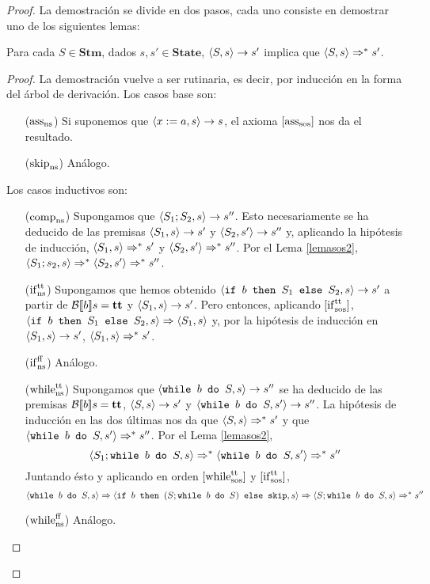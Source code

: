 \begin{proof}
La demostración se divide en dos pasos, cada uno consiste en demostrar uno de los siguientes lemas:
\begin{lema}
Para cada $S \in \mathbf{Stm}$, dados $s, s' \in \mathbf{State}$, $\langle S, s \rangle\rightarrow s'$ implica que $\langle S, s \rangle\Rightarrow^* s'$.
\end{lema}
\begin{proof}
La demostración vuelve a ser rutinaria, es decir, por inducción en la forma del árbol de derivación. Los casos base son:
\begin{itemize}
    \item[($\mathrm{ass}_{\mathrm{ns}}$)] Si suponemos que $\langle x:=a, s \rangle\to s$, el axioma $[\mathrm{ass}_{\mathrm{sos}}]$ nos da el resultado.
    \item[($\mathrm{skip}_{\mathrm{ns}}$)] Análogo.
\end{itemize}
Los casos inductivos son:
\begin{itemize}
    \item[($\mathrm{comp}_{\mathrm{ns}}$)]  Supongamos que $\langle S_1;S_2, s \rangle\to s''$. Esto necesariamente se ha deducido de las premisas $\langle S_1, s \rangle\to s'$ y $\langle S_2, s' \rangle\to s''$ y, aplicando la hipótesis de inducción, $\langle S_1, s \rangle\Rightarrow^*s'$ y $\langle S_2, s' \rangle\Rightarrow^* s''$. Por el Lema \ref{lemasos2}, $\langle S_1;s_2, s \rangle\Rightarrow^* \langle S_2, s' \rangle\Rightarrow^* s''$.
    \item[($\mathrm{if}_{\mathrm{ns}}^{\mathrm{tt}}$)] Supongamos que hemos obtenido $\langle \texttt{if }b \texttt{ then }S_1\texttt{ else }S_2, s \rangle\to s'$ a partir de $\mathcal{B}[\![b]\!]s = \mathbf{tt}$ y $\langle S_1, s \rangle\to s'$. Pero entonces, aplicando $[\mathrm{if}_{\mathrm{sos}}^{\mathrm{tt}}]$, $\langle \texttt{if }b \texttt{ then }S_1\texttt{ else }S_2, s \rangle\Rightarrow \langle S_1, s \rangle$ y, por la hipótesis de inducción en $\langle S_1, s \rangle\to s'$, $\langle S_1, s \rangle\Rightarrow^* s'$.
    \item[($\mathrm{if}_{\mathrm{ns}}^{\mathrm{ff}}$)] Análogo.
    \item[($\mathrm{while}_{\mathrm{ns}}^{\mathrm{tt}}$)] Supongamos que $\langle \texttt{while }b \texttt{ do }S, s \rangle\to s''$ se ha deducido de las premisas $\mathcal{B}[\![b]\!]s = \mathbf{tt}$, $\langle S, s \rangle\to s'$ y $\langle \texttt{while }b \texttt{ do }S, s' \rangle\to s''$. La hipótesis de inducción en las dos últimas nos da que $\langle S, s \rangle\Rightarrow^* s'$ y que $\langle \texttt{while }b \texttt{ do }S, s' \rangle\Rightarrow^* s''$. Por el Lema \ref{lemasos2}, 
    $$\langle S_1;\texttt{while }b \texttt{ do }S, s \rangle \Rightarrow^* \langle \texttt{while }b \texttt{ do }S, s' \rangle\Rightarrow^* s''$$
    Juntando ésto y aplicando en orden $[\mathrm{while}_{\mathrm{sos}}^{\mathrm{tt}}]$ y $[\mathrm{if}_{\mathrm{sos}}^{\mathrm{tt}}]$, 
    $$\langle \texttt{while }b \texttt{ do }S, s \rangle \Rightarrow \langle \texttt{if }b\texttt{ then }(S; \texttt{while }b \texttt{ do }S) \texttt{ else skip}, s \rangle \Rightarrow \langle S;\texttt{while }b \texttt{ do }S, s \rangle\Rightarrow^* s''$$
    \item[($\mathrm{while}_{\mathrm{ns}}^{\mathrm{ff}}$)] Análogo.
\end{itemize}
\end{proof}


\end{proof}
